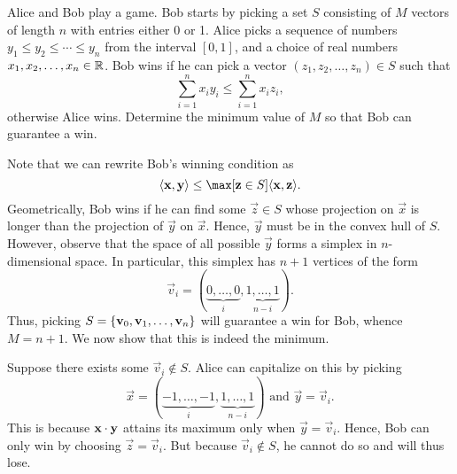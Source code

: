 \begin{question}[$n+1$]\label{A::2024-O-2-4}
    Alice and Bob play a game. Bob starts by picking a set $S$ consisting of $M$ vectors of length $n$ with entries either 0 or 1. Alice picks a sequence of numbers $y_1 \leq y_2 \leq \cdots \leq y_n$ from the interval $[0, 1]$, and a choice of real numbers $x_1, x_2, \ldots, x_n \in \mathbb{R}$. Bob wins if he can pick a vector $(z_1, z_2, \ldots, z_n) \in S$ such that \[\sum_{i=1}^n x_i y_i \leq \sum_{i=1}^n x_i z_i,\] otherwise Alice wins. Determine the minimum value of $M$ so that Bob can guarantee a win.
\end{question}
\begin{solution*}
    Note that we can rewrite Bob's winning condition as \[\ba{\vec x, \vec y} \leq \max[\vec z \in S] \ba{\vec x, \vec z}.\] Geometrically, Bob wins if he can find some $\vec z \in S$ whose projection on $\vec x$ is longer than the projection of $\vec y$ on $\vec x$. Hence, $\vec y$ must be in the convex hull of $S$. However, observe that the space of all possible $\vec y$ forms a simplex in $n$-dimensional space. In particular, this simplex has $n+1$ vertices of the form \[\vec v_i = (\underbrace{0, \ldots, 0}_{i}, \underbrace{1, \ldots, 1}_{n-i}).\] Thus, picking $S = \left\lbrace \mathbf{v}_0, \mathbf{v}_1, \ldots, \mathbf{v}_n \right\rbrace$ will guarantee a win for Bob, whence $M = n+1$. We now show that this is indeed the minimum.

    Suppose there exists some $\vec v_i \notin S$. Alice can capitalize on this by picking \[\vec x = (\underbrace{-1, \ldots, -1}_{i}, \underbrace{1, \ldots, 1}_{n-i}) \text{ and } \vec y = \vec v_i.\] This is because $\mathbf{x} \cdot \mathbf{y}$ attains its maximum only when $\vec y = \vec v_i$. Hence, Bob can only win by choosing $\vec z = \vec v_i$. But because $\vec v_i \notin S$, he cannot do so and will thus lose.
\end{solution*}

